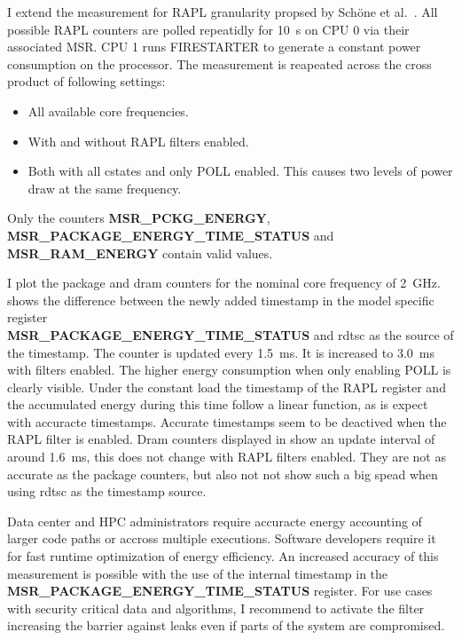 I extend the measurement for RAPL granularity propsed by Schöne et al.~\cite{Schoene_2024_Alder_Lake}.
All possible RAPL counters are polled repeatidly for \SI{10}{\s} on CPU 0 via their associated MSR.
CPU 1 runs FIRESTARTER to generate a constant power consumption on the processor.
The measurement is reapeated across the cross product of following settings:
\begin{itemize}
    \item All available core frequencies.
    \item With and without RAPL filters enabled.
    \item Both with all cstates and only POLL enabled.
    This causes two levels of power draw at the same frequency.
\end{itemize}
Only the counters \textbf{MSR\_PCKG\_ENERGY}, \textbf{MSR\_PACKAGE\_ENERGY\_TIME\_STATUS} and\\ \textbf{MSR\_RAM\_ENERGY} contain valid values.

I plot the package and dram counters for the nominal core frequency of \SI{2}{\GHz}.
 shows the difference between the newly added timestamp in the model specific register\\ \textbf{MSR\_PACKAGE\_ENERGY\_TIME\_STATUS} and rdtsc as the source of the timestamp.
The counter is updated every \SI{1.5}{\ms}.
It is increased to \SI{3.0}{\ms} with filters enabled.
The higher energy consumption when only enabling POLL is clearly visible.
Under the constant load the timestamp of the RAPL register and the accumulated energy during this time follow a linear function, as is expect with accuracte timestamps.
Accurate timestamps seem to be deactived when the RAPL filter is enabled.
Dram counters displayed in  show an update interval of around \SI{1.6}{\ms}, this does not change with RAPL filters enabled.
They are not as accurate as the package counters, but also not not show such a big spead when using rdtsc as the timestamp source.

Data center and HPC administrators require accuracte energy accounting of larger code paths or accross multiple executions.
Software developers require it for fast runtime optimization of energy efficiency.
An increased accuracy of this measurement is possible with the use of the internal timestamp in the \textbf{MSR\_PACKAGE\_ENERGY\_TIME\_STATUS} register.
For use cases with security critical data and algorithms, I recommend to activate the filter increasing the barrier against leaks even if parts of the system are compromised.

